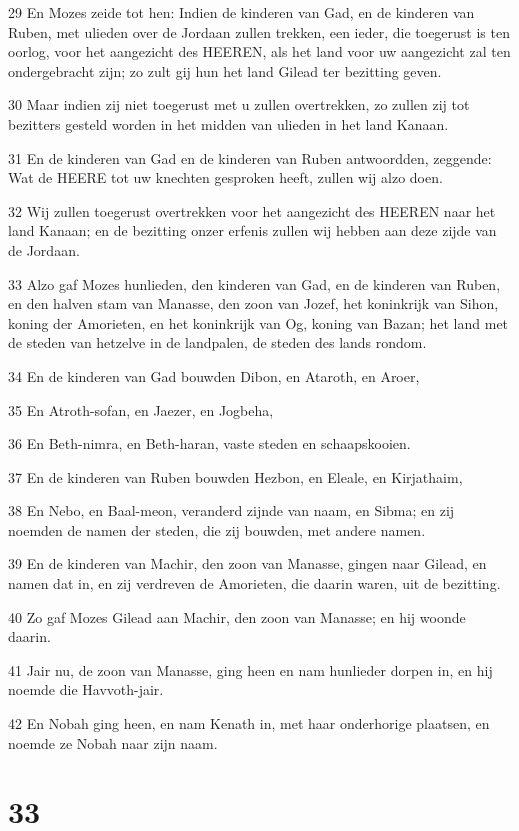 \par 29 En Mozes zeide tot hen: Indien de kinderen van Gad, en de kinderen van Ruben, met ulieden over de Jordaan zullen trekken, een ieder, die toegerust is ten oorlog, voor het aangezicht des HEEREN, als het land voor uw aangezicht zal ten ondergebracht zijn; zo zult gij hun het land Gilead ter bezitting geven.
\par 30 Maar indien zij niet toegerust met u zullen overtrekken, zo zullen zij tot bezitters gesteld worden in het midden van ulieden in het land Kanaan.
\par 31 En de kinderen van Gad en de kinderen van Ruben antwoordden, zeggende: Wat de HEERE tot uw knechten gesproken heeft, zullen wij alzo doen.
\par 32 Wij zullen toegerust overtrekken voor het aangezicht des HEEREN naar het land Kanaan; en de bezitting onzer erfenis zullen wij hebben aan deze zijde van de Jordaan.
\par 33 Alzo gaf Mozes hunlieden, den kinderen van Gad, en de kinderen van Ruben, en den halven stam van Manasse, den zoon van Jozef, het koninkrijk van Sihon, koning der Amorieten, en het koninkrijk van Og, koning van Bazan; het land met de steden van hetzelve in de landpalen, de steden des lands rondom.
\par 34 En de kinderen van Gad bouwden Dibon, en Ataroth, en Aroer,
\par 35 En Atroth-sofan, en Jaezer, en Jogbeha,
\par 36 En Beth-nimra, en Beth-haran, vaste steden en schaapskooien.
\par 37 En de kinderen van Ruben bouwden Hezbon, en Eleale, en Kirjathaim,
\par 38 En Nebo, en Baal-meon, veranderd zijnde van naam, en Sibma; en zij noemden de namen der steden, die zij bouwden, met andere namen.
\par 39 En de kinderen van Machir, den zoon van Manasse, gingen naar Gilead, en namen dat in, en zij verdreven de Amorieten, die daarin waren, uit de bezitting.
\par 40 Zo gaf Mozes Gilead aan Machir, den zoon van Manasse; en hij woonde daarin.
\par 41 Jair nu, de zoon van Manasse, ging heen en nam hunlieder dorpen in, en hij noemde die Havvoth-jair.
\par 42 En Nobah ging heen, en nam Kenath in, met haar onderhorige plaatsen, en noemde ze Nobah naar zijn naam.

\chapter{33}

